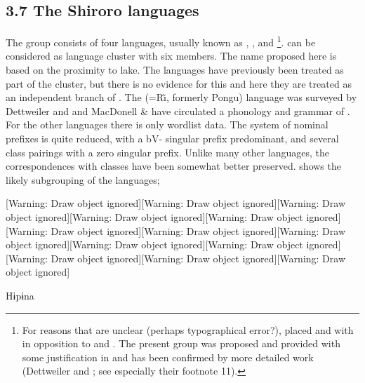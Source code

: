 \documentclass[output=paper]{langsci/langscibook}
\begin{document}
\subsection{{3.7 The Shiroro languages}}

The  group consists of four languages, usually known as , ,  and \footnote{For reasons that are unclear (perhaps typographical error?), \citet{Gerhardt1989} placed  and  with  in opposition to  and . The present group was proposed and provided with some justification in \citet{Blench1988} and has been confirmed by more detailed work (Dettweiler and \citealt{Dettweiler1995}; see especially their footnote 11).}.  can be considered as language cluster with six members. The name proposed here is based on the proximity to  lake. The  languages have previously been treated as part of the  cluster, but there is no evidence for this and here they are treated as an independent branch of . The  (=R\~\i, formerly Pongu) language was surveyed by Dettweiler and \citet{Dettweiler1992} and MacDonell \& \citet{Smith2004} have circulated a phonology and grammar of . For the other languages there is only wordlist data. The  system of nominal prefixes is quite reduced, with a bV- singular prefix predominant, and several class pairings with a zero singular prefix. Unlike many other  languages, the correspondences with  classes have been somewhat better preserved.  shows the likely subgrouping of the  languages;

[Warning: Draw object ignored][Warning: Draw object ignored][Warning: Draw object ignored][Warning: Draw object ignored][Warning: Draw object ignored][Warning: Draw object ignored][Warning: Draw object ignored][Warning: Draw object ignored][Warning: Draw object ignored][Warning: Draw object ignored][Warning: Draw object ignored][Warning: Draw object ignored][Warning: Draw object ignored]














Hɨpɨna
\end{document}
